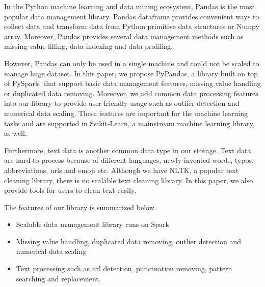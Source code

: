 \documentclass[sigconf]{acmart}
\begin{document}
In the Python machine learning and data mining ecosystem, Pandas\cite{pandas} is the most popular data management library. Pandas dataframe provides convenient ways to collect data and transform data from Python primitive data structures or Numpy\cite{numpy} array. Moreover, Pandas provides several data management methods such as missing value filling, data indexing and data profiling. 
	
However, Pandas can only be used in a single machine and could not be scaled to manage huge dataset. In this paper, we propose PyPandas, a library built on top of PySpark, that support basic data management features, missing value handling or duplicated data removing. Moreover, we add common data processing features into our library to provide user friendly usage such as outlier detection and numerical data scaling. These features are important for the machine learning tasks and are supported in Scikit-Learn\cite{scikit-learn}, a mainstream machine learning library, as well.
	
Furthermore, text data is another common data type in our storage. Text data are hard to process because of different languages, newly invented words, typos, abbreviations, urls and emoji etc. Although we have NLTK\cite{nltk}, a popular text cleaning library, there is no scalable text cleaning library. In this paper, we also provide tools for users to clean text easily. 
	
The features of our library is summarized below.
\begin{itemize}
	\item{Scalable data management library runs on Spark}
	\item{Missing value handling, duplicated data removing, outlier detection and numerical data scaling}
	\item{Text processing such as url detection, punctuation removing, pattern searching and replacement. }
\end{itemize}	
\end{document}
